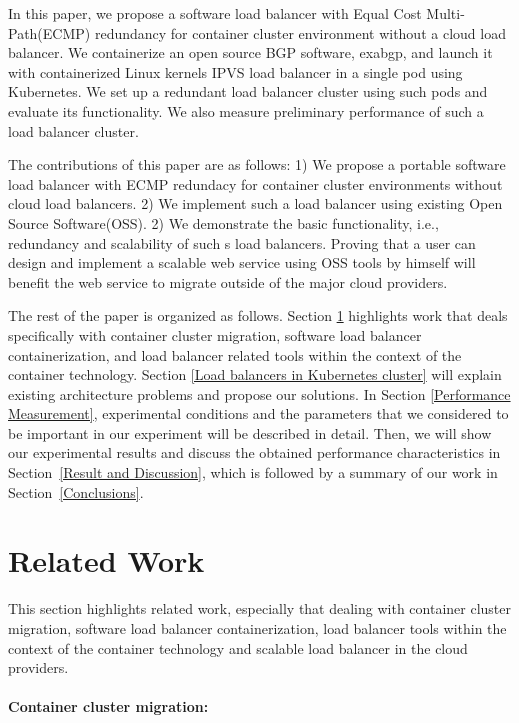 In this paper, we propose a software load balancer with Equal Cost Multi-Path(ECMP)\cite{} redundancy for container cluster environment without a cloud load balancer.
We containerize an open source BGP software, exabgp\cite{}, and launch it with containerized Linux kernels IPVS load balancer in a single pod using Kubernetes.
We set up a redundant load balancer cluster using such pods and evaluate its functionality.  
We also measure preliminary performance of such a load balancer cluster.

The contributions of this paper are as follows: 
1) We propose a portable software load balancer with ECMP redundacy for container cluster environments without cloud load balancers.
2) We implement such a load balancer using existing Open Source Software(OSS).
2) We demonstrate the basic functionality, i.e., redundancy and scalability of such s load balancers.
Proving that a user can design and implement a scalable web service using OSS tools by himself will benefit the web service to migrate outside of the major cloud providers.

The rest of the paper is organized as follows.
Section \ref{Related Work} highlights work that deals specifically with container cluster migration, 
software load balancer containerization, and load balancer related tools within the context of the container technology. 
Section \ref{Load balancers in Kubernetes cluster} will explain existing architecture problems and propose our solutions.
In Section \ref{Performance Measurement}, experimental conditions and the parameters 
that we considered to be important in our experiment will be described in detail.
Then, we will show our experimental results and discuss the obtained performance characteristics in Section~\ref{Result and Discussion},  
which is followed by a summary of our work in Section~\ref{Conclusions}.

\section{Related Work}\label{Related Work}

This section highlights related work, especially that dealing with container cluster migration, 
software load balancer containerization, load balancer tools within the context of the container technology and scalable load balancer in the cloud providers.

\paragraph{\bf Container cluster migration:}

